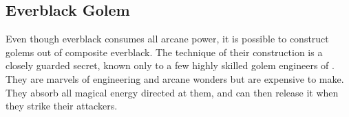 \subsection{Everblack Golem}
\label{sec:Everblack Golem}

Even though everblack consumes all arcane power, it is possible to construct
golems out of composite everblack. The technique of their construction is a
closely guarded secret, known only to a few highly skilled golem engineers of
. They are marvels of engineering and arcane wonders but
are expensive to make. They absorb all magical energy directed at them, and
can then release it when they strike their attackers.
